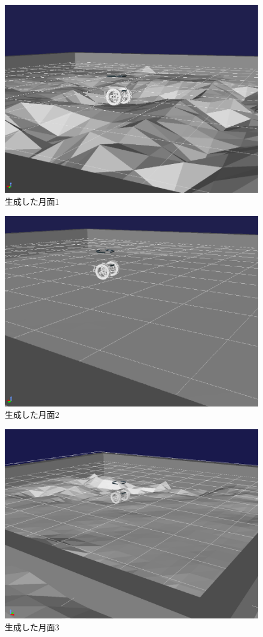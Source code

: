 \begin{figure}[htbp]
  \begin{center}
   \includegraphics[width=0.6\linewidth]{images/test_field1.png}
   \caption{生成した月面1}
   \label{fig:test_field1}
  \end{center}
 \end{figure}
 \begin{figure}[htbp]
  \begin{center}
   \includegraphics[width=0.6\linewidth]{images/test_field2.png}
   \caption{生成した月面2}
   \label{fig:test_field2}
  \end{center}
 \end{figure}
 \begin{figure}[htbp]
  \begin{center}
   \includegraphics[width=0.6\linewidth]{images/generate_field3.png}
   \caption{生成した月面3}
   \label{fig:generate_field3}
  \end{center}
 \end{figure}
